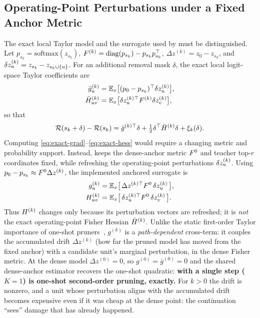 \subsection{Operating-Point Perturbations under a Fixed Anchor Metric}
The exact local Taylor model and the surrogate used by \method must be distinguished. Let
$p_{s_k}=\mathrm{softmax}(z_{s_k})$, $F^{(k)}=\mathrm{diag}(p_{s_k})-p_{s_k}p_{s_k}^{\top}$,
$\Delta z^{(k)}=z_0-z_{s_k}$, and
$\delta z^{(k)}_u=z_{s_k}-z_{s_k\cup\{u\}}$. For an additional removal mask $\delta$, the exact local
logit-space Taylor coefficients are
\begin{align}
\bar g^{(k)}_u &= \mathbb{E}_x\big[(p_0-p_{s_k})^\top\delta z^{(k)}_u\big],
\label{eq:exact-grad}\\
\bar{H}^{(k)}_{uv} &= \mathbb{E}_x\big[\delta z^{(k)\top}_uF^{(k)}\delta z^{(k)}_v\big],
\label{eq:exact-hess}
\end{align}
so that
\begin{equation}
\mathcal{R}(s_k+\delta)-\mathcal{R}(s_k)
=\bar g^{(k)\top}\delta+\tfrac12\delta^\top\bar{H}^{(k)}\delta+\xi_k(\delta).
\label{eq:local}
\end{equation}
Computing \eqref{eq:exact-grad}--\eqref{eq:exact-hess} would require a changing metric and probability
support. Instead, \method keeps the dense-anchor metric $F^0$ and teacher top-$r$ coordinates fixed,
while refreshing the operating-point perturbations $\delta z^{(k)}_u$. Using
$p_0-p_{s_k}\approx F^0\Delta z^{(k)}$, the implemented anchored surrogate is
\begin{align}
g^{(k)}_u &= \mathbb{E}_{x}\big[\,\Delta z^{(k)\top} F^0\, \delta z^{(k)}_u\,\big],
\label{eq:grad}\\
H^{(k)}_{uv} &= \mathbb{E}_{x}\big[\,\delta z^{(k)\top}_u F^0\, \delta z^{(k)}_v\,\big].
\label{eq:hess}
\end{align}
Thus $H^{(k)}$ changes only because its perturbation vectors are refreshed; it is \emph{not} the exact
operating-point Fisher Hessian $\bar{H}^{(k)}$.
Unlike the static first-order Taylor importance of one-shot pruners~\citep{molchanov2019taylor,ma2023llmpruner},
$g^{(k)}$ is a \emph{path-dependent} cross-term: it couples the accumulated drift
$\Delta z^{(k)}$ (how far the pruned model has moved from the fixed anchor) with a candidate unit's
marginal perturbation, in the dense Fisher metric. At the dense model $\Delta z^{(0)}{=}0$, so
$g^{(0)}{=}\bar g^{(0)}{=}0$ and the shared dense-anchor estimator recovers the one-shot quadratic:
\textbf{\method with a single step ($K{=}1$) is one-shot second-order pruning, exactly.} For $k>0$ the
drift is nonzero, and a unit whose perturbation aligns with the accumulated drift becomes expensive even
if it was cheap at the dense point: the continuation ``sees'' damage that has already happened.

